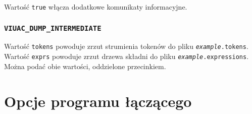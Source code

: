 Wartość \texttt{true} włącza dodatkowe komunikaty informacyjne.

\subsubsection{\texttt{VIUAC\_DUMP\_INTERMEDIATE}}

Wartość \texttt{tokens} powoduje zrzut strumienia tokenów do pliku \texttt{\emph{example}.tokens}.
Wartość \texttt{exprs} powoduje zrzut drzewa składni do pliku \texttt{\emph{example}.expressions}.
Można podać obie wartości, oddzielone przecinkiem.

\newpage
\section{Opcje programu łączącego}
